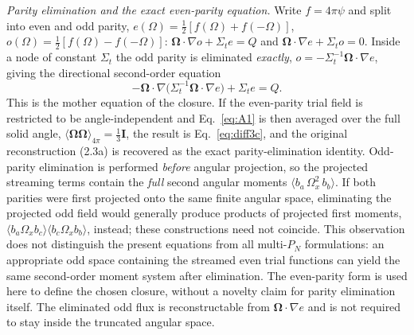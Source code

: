 \documentclass[11pt,a4paper]{article}
\begin{document}
\emph{Parity elimination and the exact even-parity equation.}
Write $f=4\pi\psi$ and split into even and odd parity,
$e(\Omega)=\tfrac12[f(\Omega)+f(-\Omega)]$,
$o(\Omega)=\tfrac12[f(\Omega)-f(-\Omega)]$:
$\boldsymbol{\Omega}\cdot\nabla o+\Sigma_t e=Q$ and
$\boldsymbol{\Omega}\cdot\nabla e+\Sigma_t o=0$. Inside a node of
constant $\Sigma_t$ the odd parity is eliminated \emph{exactly},
$o=-\Sigma_t^{-1}\boldsymbol{\Omega}\cdot\nabla e$, giving the
directional second-order equation
\begin{equation}
-\boldsymbol{\Omega}\cdot\nabla\Big(\Sigma_t^{-1}
\boldsymbol{\Omega}\cdot\nabla e\Big)+\Sigma_t e = Q.
\label{eq:A1}
\end{equation}
This is the mother equation of the closure. If the even-parity trial
field is restricted to be angle-independent and
Eq.~\eqref{eq:A1} is then averaged over the full solid angle,
$\langle\boldsymbol{\Omega}\boldsymbol{\Omega}\rangle_{4\pi}
=\tfrac13\mathbf{I}$, the result is Eq.~\eqref{eq:diff3c}, and the
original reconstruction (2.3a) is recovered as the exact
parity-elimination identity. Odd-parity elimination is performed \emph{before} angular
projection, so the projected streaming terms contain the \emph{full}
second angular moments $\langle b_a\,\Omega_x^2\, b_b\rangle$. If
both parities were first projected onto the same finite angular space,
eliminating the projected odd field would generally produce products of
projected first moments,
$\langle b_a\Omega_x b_c\rangle\langle b_c\Omega_x b_b\rangle$,
instead; these constructions need not coincide. This observation does
not distinguish the present equations from all multi-$P_N$
formulations: an appropriate odd space containing the streamed even
trial functions can yield the same second-order moment system after
elimination. The even-parity form is used here to define the chosen
closure, without a novelty claim for parity elimination itself. The
eliminated odd flux is reconstructable from
$\boldsymbol{\Omega}\cdot\nabla e$ and is not required to stay
inside the truncated angular space.
\end{document}
